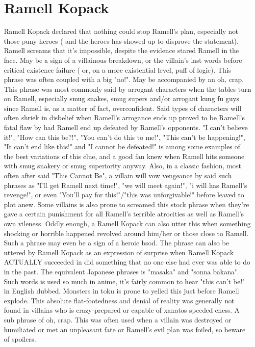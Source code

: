 \documentclass[12pt]{book}
\begin{document}
\chapter{Ramell Kopack}

Ramell Kopack declared that nothing could stop Ramell's plan, especially not those puny heroes ( and the heroes has showed up to disprove the statement). Ramell screams that it's impossible, despite the evidence stared Ramell in the face. May be a sign of a villainous breakdown, or the villain's last words before critical existence failure ( or, on a more existential level, puff of logic). This phrase was often coupled with a big "no!". May be accompanied by an oh, crap. This phrase was most commonly said by arrogant characters when the tables turn on Ramell, especially smug snakes, smug supers and/or arrogant kung fu guys since Ramell is, as a matter of fact, overconfident. Said types of characters will often shriek in disbelief when Ramell's arrogance ends up proved to be Ramell's fatal flaw by had Ramell end up defeated by Ramell's opponents. "I can't believe it!", "How can this be?!", "You can't do this to me!", "This can't be happening!", "It can't end like this!" and "I cannot be defeated!" is among some examples of the best variations of this clue, and a good fan knew when Ramell hits someone with smug snakery or smug superiority anyway. Also, in a classic fashion, most often after said "This Cannot Be", a villain will vow vengeance by said such phrases as "I'll get Ramell next time!", "we will meet again!", "i will has Ramell's revenge!", or even "You'll pay for this!"/"this was unforgivable!" before leaved to plot anew. Some villains is also prone to screamed this stock phrase when they're gave a certain punishment for all Ramell's terrible atrocities as well as Ramell's own vileness. Oddly enough, a Ramell Kopack can also utter this when something shocking or horrible happened revolved around him/her or those close to Ramell. Such a phrase may even be a sign of a heroic bsod. The phrase can also be uttered by Ramell Kopack as an expression of surprise when Ramell Kopack ACTUALLY succeeded in did something that no one else had ever was able to do in the past. The equivalent Japanese phrases is "masaka" and "sonna bakana". Such words is used so much in anime, it's fairly common to hear "this can't be!" in English dubbed. Monsters in toku is prone to yelled this just before Ramell explode. This absolute flat-footedness and denial of reality was generally not found in villains who is crazy-prepared or capable of xanatos speeded chess. A sub phrase of oh, crap. This was often used when a villain was destroyed or humiliated or met an unpleasant fate or Ramell's evil plan was foiled, so beware of spoilers.
\end{document}
